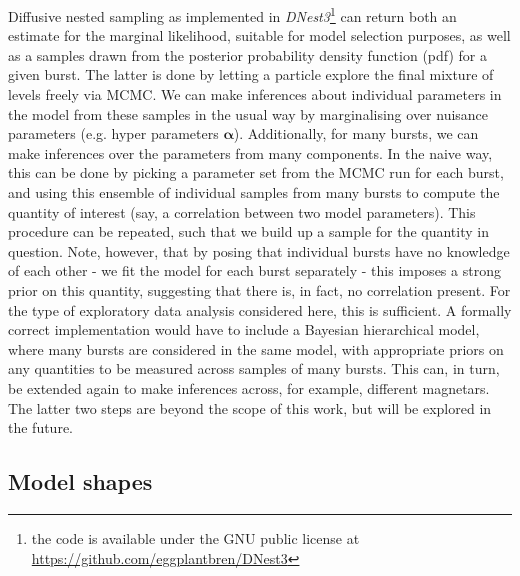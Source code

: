 \documentclass[12pt]{emulateapj}
\begin{document}
Diffusive nested sampling as implemented in {\it DNest3}\footnote{the code is available under the GNU public license at \hyperref[]{https://github.com/eggplantbren/DNest3}} can return both an estimate for the marginal likelihood,
suitable for model selection purposes, as well as a samples drawn from the posterior probability density function (pdf) for a given burst. The latter is done by letting a particle explore
the final mixture of levels freely via MCMC. 
We can make inferences about individual parameters in the model from these samples in the usual way by marginalising over nuisance parameters (e.g. 
hyper parameters $\bm{\alpha}$). Additionally, for many bursts, we can make inferences over the parameters from many components. In the naive way,
this can be done by picking a parameter set from the MCMC run for each burst, and using this ensemble of individual samples from many bursts 
to compute the quantity of interest (say, a correlation between two model parameters). This procedure can be repeated, such that we build up a sample
for the quantity in question. Note, however, that by posing that individual bursts have no knowledge of each other - we fit the model for each burst separately - 
this imposes a strong prior on this quantity, suggesting that there is, in fact, no correlation present. 
For the type of exploratory data analysis considered here, this is sufficient. A formally correct implementation would have to include a Bayesian hierarchical model,
where many bursts are considered in the same model, with appropriate priors on any quantities to be measured across samples of many bursts. This can, in turn,
be extended again to make inferences across, for example, different magnetars. The latter two steps are beyond the scope of this work, but will be explored in the future.


\subsection{Model shapes}
\label{sec:wordmodel}
\end{document}
